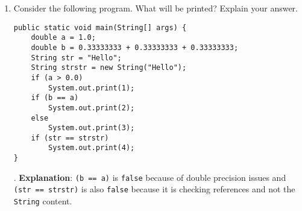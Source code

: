 \Instructions
\begin{enumerate}
\item {} Consider the following program. What will be printed? Explain your answer.

\begin{lstlisting}
public static void main(String[] args) {
	double a = 1.0;
	double b = 0.33333333 + 0.33333333 + 0.33333333;
	String str = "Hello";
	String strstr = new String("Hello");
	if (a > 0.0)
    	System.out.print(1);
	if (b == a)
    	System.out.print(2);
	else 
    	System.out.print(3);
 	if (str == strstr)
    	System.out.print(4);
}
\end{lstlisting}

. \textbf{Explanation}: \texttt{(b == a)} is \texttt{false} because of double precision issues and  \texttt{(str == strstr)} is also \texttt{false} because it is checking references and not the \texttt{String} content. 

\end{enumerate}